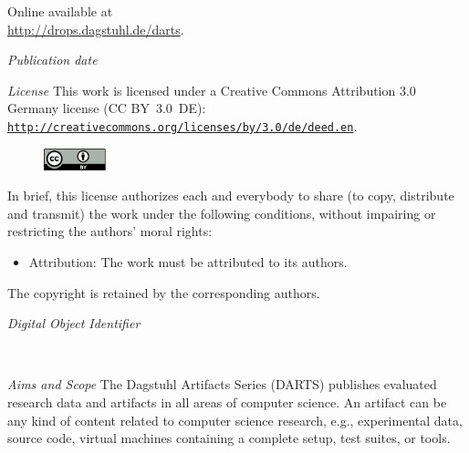 \documentclass[a4paper,UKenglish]{dartsmaster}
\begin{document}
\begin{publicationinfo}
Online available at \\ \url{http://drops.dagstuhl.de/darts}.

\bigskip
\emph{Publication date}\newline
\printDatePublished{}



\bigskip


\bigskip

\emph{License}\newline
This work is licensed under a Creative Commons Attribution 3.0 Germany license (CC BY~3.0~DE): \href{http://creativecommons.org/licenses/by/3.0/de/deed.en}{\nolinkurl{http://creativecommons.org/licenses/by/}}\linebreak \href{http://creativecommons.org/licenses/by/3.0/de/deed.en}{\nolinkurl{3.0/de/deed.en}}.
\begin{figure}
\vspace*{-1\baselineskip}
\includegraphics[width=1.8cm]{cc-by}
\end{figure} 
In brief, this license authorizes each and everybody to share (to
copy, distribute and transmit) the work under the following
conditions, without impairing or restricting the authors'
moral rights:
\begin{itemize}
\item Attribution: The work must be attributed to its authors.
\end{itemize}

The copyright is retained by the corresponding authors.

\vfill
\emph{Digital Object Identifier}\newline
\printForewordDOI

\newpage

~~

\bigskip

\emph{Aims and Scope}\newline
The Dagstuhl Artifacts Series (DARTS) publishes evaluated research data and artifacts in all areas of computer science. An artifact can be any kind of content related to computer science research, e.g., experimental data, source code, virtual machines containing a complete setup, test suites, or tools.


\end{publicationinfo}
\end{document}
